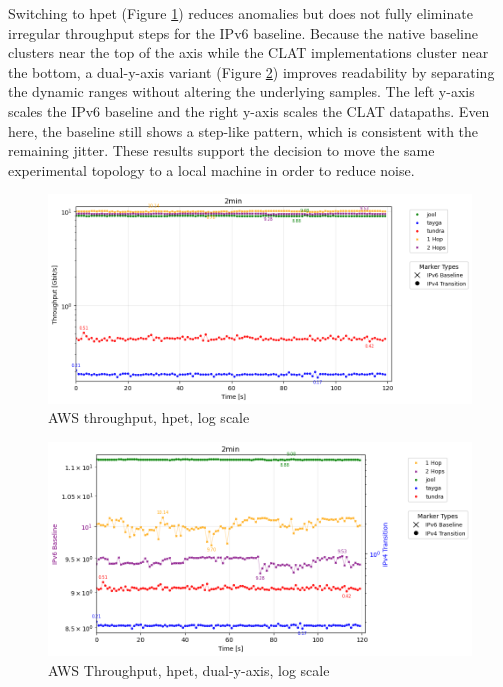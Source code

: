 Switching to hpet (Figure \ref{fig:AWS_tcp_sameScale_hpet_log}) reduces anomalies but does not fully eliminate irregular throughput steps for the IPv6 baseline. Because the native baseline clusters near the top of the axis while the CLAT implementations cluster near the bottom, a dual-y-axis variant (Figure \ref{fig:AWS_tcp_dualAxis_hpet_log}) improves readability by separating the dynamic ranges without altering the underlying samples. The left y-axis scales the IPv6 baseline and the right y-axis scales the CLAT datapaths. Even here, the baseline still shows a step-like pattern, which is consistent with the remaining jitter. These results support the decision to move the same experimental topology to a local machine in order to reduce noise.


\begin{figure}[H]
    \centering
    \includegraphics[width=1\textwidth]{resources/finalPlots/combinedplots/AWS_tcp_sameScale_hpet_2min_log.png}
    \caption{AWS throughput, hpet, log scale}
    \label{fig:AWS_tcp_sameScale_hpet_log}

\end{figure}


\begin{figure}[H]
    \centering
    \includegraphics[width=1\textwidth]{resources/finalPlots/Jitterplots/AWS_tcp_dualAxis_hpet_2min_log.png}
    \caption{AWS Throughput, hpet, dual-y-axis, log scale}
    \label{fig:AWS_tcp_dualAxis_hpet_log}
\end{figure}



